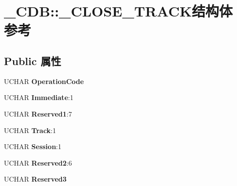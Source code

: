 \hypertarget{struct___c_d_b_1_1___c_l_o_s_e___t_r_a_c_k}{}\section{\+\_\+\+C\+DB\+:\+:\+\_\+\+C\+L\+O\+S\+E\+\_\+\+T\+R\+A\+C\+K结构体 参考}
\label{struct___c_d_b_1_1___c_l_o_s_e___t_r_a_c_k}
\subsection*{Public 属性}
\begin{DoxyCompactItemize}
\item 
\mbox{\label{struct___c_d_b_1_1___c_l_o_s_e___t_r_a_c_k_ade534bbf63920f0b7d28ed8c2dffe079}} 
U\+C\+H\+AR {\bfseries Operation\+Code}
\item 
\mbox{\label{struct___c_d_b_1_1___c_l_o_s_e___t_r_a_c_k_a50a64ea9c52c2311eb713f0e3aeeafda}} 
U\+C\+H\+AR {\bfseries Immediate}\+:1
\item 
\mbox{\label{struct___c_d_b_1_1___c_l_o_s_e___t_r_a_c_k_a73e2ec419dbb11040a1b34f3b444e9e5}} 
U\+C\+H\+AR {\bfseries Reserved1}\+:7
\item 
\mbox{\label{struct___c_d_b_1_1___c_l_o_s_e___t_r_a_c_k_a4d36ecfc04e0379ec13588824bb01b8d}} 
U\+C\+H\+AR {\bfseries Track}\+:1
\item 
\mbox{\label{struct___c_d_b_1_1___c_l_o_s_e___t_r_a_c_k_a3bd8087b765e966b4329b1c31ffd0594}} 
U\+C\+H\+AR {\bfseries Session}\+:1
\item 
\mbox{\label{struct___c_d_b_1_1___c_l_o_s_e___t_r_a_c_k_a82a53a24bf589e9a93097a249cc943e2}} 
U\+C\+H\+AR {\bfseries Reserved2}\+:6
\item 
\mbox{\label{struct___c_d_b_1_1___c_l_o_s_e___t_r_a_c_k_a603f9b12a9c68605739dda54cfe65836}} 
U\+C\+H\+AR {\bfseries Reserved3}

\end{DoxyCompactItemize}
